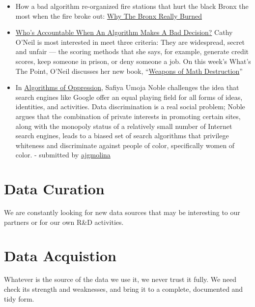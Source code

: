 \documentclass[
  fontsize=13pt,
  english,
  a4paper,
  openany, a4paper, oneside]{book}
\begin{document}
\begin{itemize}
\item
  How a bad algorithm re-organized fire stations that hurt the black Bronx the most when the fire broke out: \href{https://fivethirtyeight.com/features/why-the-bronx-really-burned/}{Why The Bronx Really Burned}
\item
  \href{https://fivethirtyeight.com/features/whos-accountable-when-an-algorithm-makes-a-bad-decision/}{Who's Accountable When An Algorithm Makes A Bad Decision?} Cathy O'Neil is most interested in meet three criteria: They are widespread, secret and unfair --- the scoring methods that she says, for example, generate credit scores, keep someone in prison, or deny someone a job. On this week's What's The Point, O'Neil discusses her new book, ``\href{https://weaponsofmathdestructionbook.com/}{Weapons of Math Destruction}''
\item
  In \href{https://nyupress.org/9781479837243/algorithms-of-oppression/}{Algorithms of Oppression}, Safiya Umoja Noble challenges the idea that search engines like Google offer an equal playing field for all forms of ideas, identities, and activities. Data discrimination is a real social problem; Noble argues that the combination of private interests in promoting certain sites, along with the monopoly status of a relatively small number of Internet search engines, leads to a biased set of search algorithms that privilege whiteness and discriminate against people of color, specifically women of color. - submitted by \href{https://keybase.io/ajgmolina}{ajgmolina}
\end{itemize}

\hypertarget{data-curation}{%
\chapter{Data Curation}\label{data-curation}}

We are constantly looking for new data sources that may be interesting to our partners or for our own R\&D activities.

\hypertarget{acquisition}{%
\chapter{Data Acquistion}\label{acquisition}}

Whatever is the source of the data we use it, we never trust it fully. We need check its strength and weaknesses, and bring it to a complete, documented and tidy form.
\end{document}
